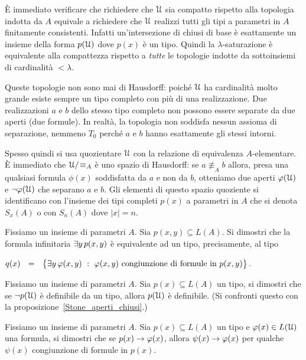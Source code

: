 \`E immediato verificare che richiedere che $\EuScript U$ sia compatto rispetto alla topologia indotta da $A$ equivale a richiedere che $\EuScript U$ realizzi tutti gli tipi a parametri in $A$ finitamente consistenti. Infatti un'intersezione di chiusi di base \`e esattamente un insieme della forma $p(\EuScript U)$ dove $p(x)$ \`e un tipo. Quindi la $\lambda$-saturazione \`e equivalente alla compattezza rispetto a \textit{tutte\/} le topologie indotte da sottoinsiemi di cardinalit\`a $<\lambda$.

Queste topologie non sono mai di Hausdorff: poich\'e $\EuScript U$ ha cardinalit\`a molto grande esiste sempre un tipo completo con pi\`u di una realizzazione. Due realizzazioni $a$ e $b$ dello stesso tipo completo non possono essere separate da due aperti (due formule). In realt\`a, la topologia non soddisfa nessun assioma di separazione, nemmeno $T_0$ perch\'e $a$ e $b$ hanno esattamente gli stessi intorni. 

Spesso quindi si usa quozientare $\EuScript U$ con la relazione di equivalenza $A$-elementare. \`E immediato che $\EuScript U/\!\equiv_A$ \`e uno spazio di Hausdorff: se  $a\nequiv_Ab$ allora, presa una qualsiasi formula $\phi(x)$ soddisfatta da $a$ e non da $b$, otteniamo due aperti $\varphi(\EuScript U)$ e $\neg\varphi(\EuScript U)$ che separano $a$ e $b$. Gli elementi di questo spazio quoziente si identificano  con l'insieme dei tipi completi $p(x)$ a parametri in $A$ che si denota \emph{$S_x(A)$\/} o con \emph{$S_n(A)$} dove $|x|=n$. 

\begin{exercise}\label{definibilitasaturazione}
Fissiamo un insieme di parametri $A$. Sia $p(x,y)\subseteq L(A)$. Si dimostri che la formula infinitaria $\exists y\,p(x,y)$ \`e equivalente ad un tipo, precisamente, al tipo 

\hfill $q(x)\ \ =\ \ \big\{ \E y\,\phi(x,y)\ :\ \phi(x,y) \textrm{ congiunzione di formule in }  p(x,y)\big\}$.\QED 
\end{exercise}

\begin{exercise}
Fissiamo un insieme di parametri $A$. Sia $p(x)\subseteq L(A)$ un tipo, si dimostri che se $\neg p(\EuScript U)$ \`e definibile da un tipo, allora $p(\EuScript U)$ \`e definibile. (Si confronti questo con la proposizione~\ref{Stone_aperti_chiusi}.)\QED 
\end{exercise}

\begin{exercise}
Fissiamo un insieme di parametri $A$. Sia $p(x)\subseteq L(A)$ un tipo e $\varphi(x)\in L(\EuScript U)$ una formula, si dimostri che se $p(x)\rightarrow\varphi(x)$, allora $\psi(x)\rightarrow\varphi(x)$ per qualche $\psi(x)$ congiunzione di formule in $p(x)$.\QED 
\end{exercise}


